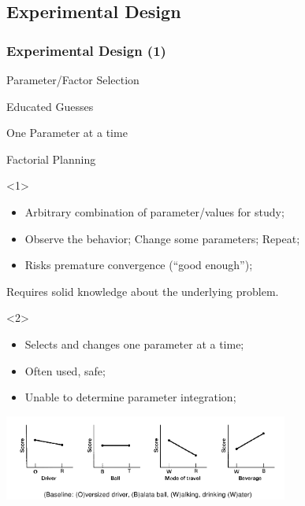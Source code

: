 \documentclass{beamer}
\begin{document}
\subsection{Experimental Design}

\begin{frame}
  \frametitle{Experimental Design (1)}
  \begin{block}{Parameter/Factor Selection}
    \begin{itemize}
      {\small
      \item \alert<1>{Educated Guesses}
      \item \alert<2>{One Parameter at a time}
      \item \alert<3>{Factorial Planning}
      }
    \end{itemize}
  \end{block}
  \medskip
  
  {\small
  \begin{onlyenv}<1>
    \begin{itemize}
    \item Arbitrary combination of parameter/values for study;
    \item Observe the behavior; Change some parameters; Repeat;
    \item Risks premature convergence (``good enough'');
    \end{itemize}
    \bigskip
    
    Requires solid knowledge about the underlying problem.
  \end{onlyenv}
  
  \begin{onlyenv}<2>
    \begin{itemize}
    \item Selects and changes one parameter at a time;
    \item Often used, safe;
    \item Unable to determine parameter integration;
    \end{itemize}
    \begin{center}
      \includegraphics[width=0.7\textwidth]{img/singleparameter}
    \end{center}
  \end{onlyenv}

}
\end{frame}
\end{document}
